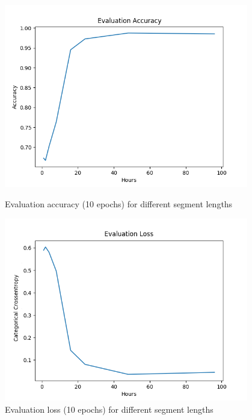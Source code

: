\begin{figure}
      \includegraphics[height=8cm]{img/control_condition/plot_acc_eval.png}
      \caption{Evaluation accuracy (10 epochs) for different segment lengths}
      \label{figure:control_condition_acc_eval}

      \includegraphics[height=8cm]{img/control_condition/plot_loss_eval.png}
      \caption{Evaluation loss (10 epochs) for different segment lengths}
      \label{figure:control_condition_loss_eval}
\end{figure}

